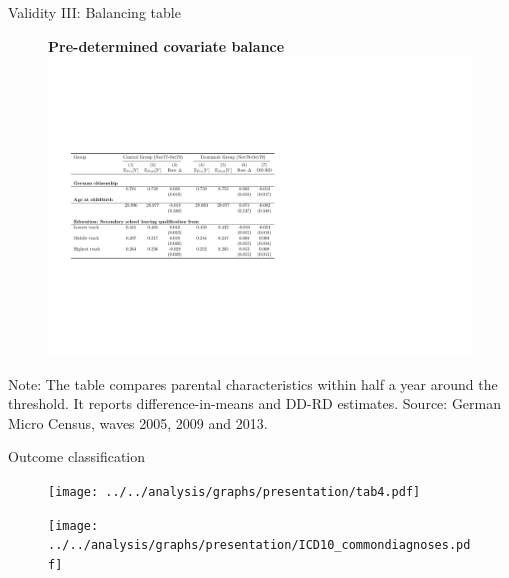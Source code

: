 \documentclass[aspectratio=169,handout]{beamer} %
\begin{document}
\begin{frame}{Validity III: Balancing table}
\begin{figure}
\textbf{Pre-determined covariate balance}
\includegraphics[width=0.8\linewidth]{../../analysis/graphs/presentation/parental_covariate_balance}
\end{figure}
\begin{minipage}{0.9\linewidth}
\begin{center}\vspace{-1cm}
\tiny \flushleft Note: The table compares parental characteristics within half a year around the threshold. It reports difference-in-means and DD-RD estimates. Source: German Micro Census, waves 2005, 2009 and 2013. 
\end{center}
\end{minipage}

\hyperlink{BACK_FROM_VALIDITY}{}
\end{frame}


\begin{frame}{Outcome classification}
\label{ICD10 CLASSIFICATION}
\begin{figure}
	\texttt{[image: ../../analysis/graphs/presentation/tab4.pdf]}
\end{figure}
\hyperlink{VARIABLES}{}
\end{frame}


\begin{frame}
\label{5 MOST COMMON DIAGNOSES}
\begin{figure}
	\texttt{[image: ../../analysis/graphs/presentation/ICD10\_commondiagnoses.pdf]}
\end{figure}
\vspace{-4em}
\hyperlink{VARIABLES}{}
\end{frame}
\end{document}
